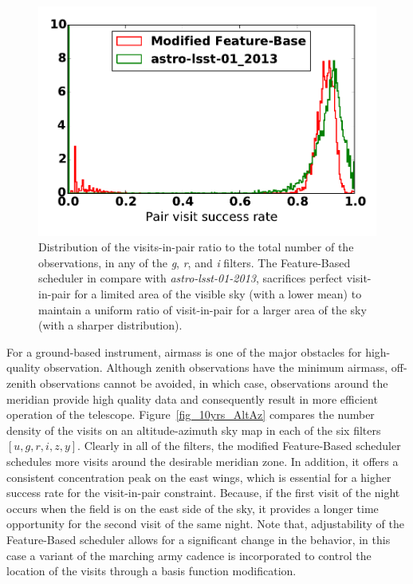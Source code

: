 \documentclass[12pt]{aastex62}
\theoremstyle{definition}
\begin{document}
\begin{figure}[h!]
\centering
\includegraphics[width=.4\linewidth]{Figures/PairHist.pdf}
\caption{Distribution of the visits-in-pair ratio to the total number of the observations, in any of the \textit{g}, \textit{r}, and \textit{i} filters. The Feature-Based scheduler in compare with \textit{astro-lsst-01-2013}, sacrifices perfect visit-in-pair for a limited area of the visible sky (with a lower mean) to maintain a uniform ratio of visit-in-pair for a larger area of the sky (with a sharper distribution).}
\label{fig_10yrs_pair_hist}
\end{figure}

For a ground-based instrument, airmass is one of the major obstacles for high-quality observation. Although zenith observations have the minimum airmass, off-zenith observations cannot be avoided, in which case, observations around the meridian provide high quality data and consequently result in more efficient operation of the telescope. Figure~\ref{fig_10yrs_AltAz} compares the number density of the visits on an altitude-azimuth sky map in each of the six filters $[u,g,r,i,z,y]$. Clearly in all of the filters, the modified Feature-Based scheduler schedules more visits around the desirable meridian zone. In addition, it offers a consistent concentration peak on the east wings, which is essential for a higher success rate for the visit-in-pair constraint. Because, if the first visit of the night occurs when the field is on the east side of the sky, it provides a longer time opportunity for the second visit of the same night. Note that, adjustability of the Feature-Based scheduler allows for a significant change in the behavior, in this case a variant of the marching army cadence is incorporated to control the location of the visits through a basis function modification.
\end{document}
